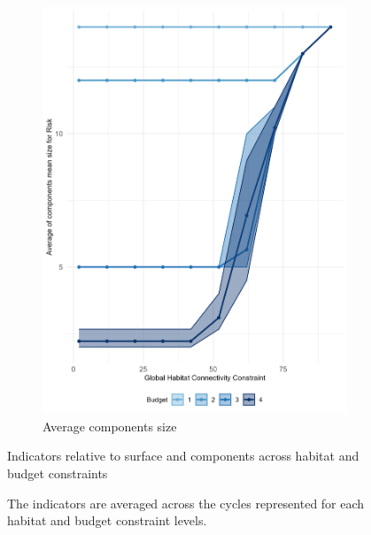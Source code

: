 \begin{figure}
    \begin{subfigure}[b]{.48\textwidth}
        \centering
        \includegraphics[height = .4\textheight]{figures/wildland/average_components_mean_size.jpg}
        \caption{Average components size}
        \label{fig:components_size}
    \end{subfigure}
    
    \caption{Indicators relative to surface and components across habitat and budget constraints}
    \caption*{The indicators are averaged across the cycles represented for each habitat and budget constraint levels.}
    \label{fig:indicators1}
\end{figure}


